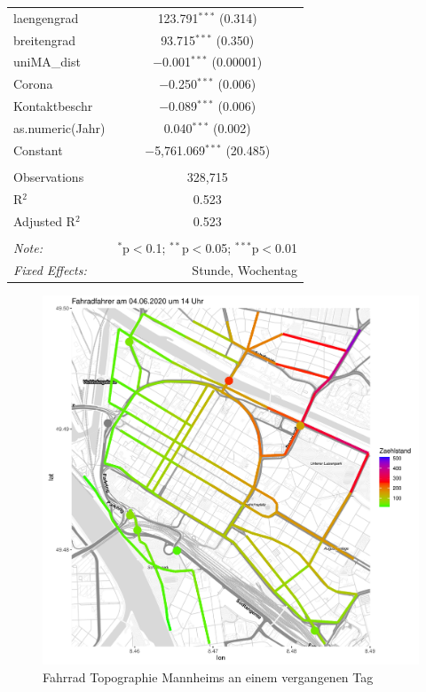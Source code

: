 \documentclass[a4paper,12pt]{thesis}
\begin{document}
\begin{table}[!htbp]
\begin{tabular}{@{\extracolsep{-15pt}}lc}
		laengengrad & 123.791$^{***}$ (0.314) \\ 
		breitengrad & 93.715$^{***}$ (0.350) \\ 
		uniMA\_dist & $-$0.001$^{***}$ (0.00001) \\ 
		Corona & $-$0.250$^{***}$ (0.006) \\ 
		Kontaktbeschr & $-$0.089$^{***}$ (0.006) \\ 
		as.numeric(Jahr) & 0.040$^{***}$ (0.002) \\ 
		Constant & $-$5,761.069$^{***}$ (20.485) \\ 
		\hline \\[-1.8ex] 
		Observations & 328,715 \\ 
		R$^{2}$ & 0.523 \\ 
		Adjusted R$^{2}$ & 0.523 \\ 
		\hline 
		\hline \\[-1.8ex] 
		\textit{Note:}  & \multicolumn{1}{r}{$^{*}$p$<$0.1; $^{**}$p$<$0.05; $^{***}$p$<$0.01} \\ 
		\textit{Fixed Effects:}  & \multicolumn{1}{r}{Stunde, Wochentag} \\
	\end{tabular} 
\end{table} 

\begin{figure}[!ht]
	\centering
	\includegraphics[width=\textwidth]{Plots/HeatmapFinal1.pdf}
	\caption{Fahrrad Topographie Mannheims an einem vergangenen Tag}
	\label{Topography1}
\end{figure}
\end{document}
